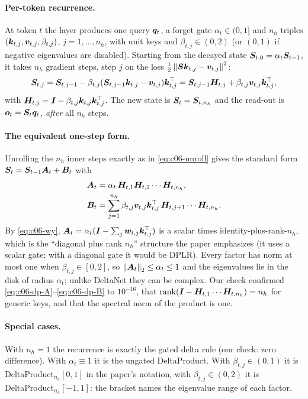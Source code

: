 \paragraph{Per-token recurrence.}
At token $t$ the layer produces one query $\bm{q}_t$, a forget gate $\alpha_t\in(0,1]$ and
$n_h$ triples $(\bm{k}_{t,j},\bm{v}_{t,j},\beta_{t,j})$, $j=1,\dots,n_h$, with unit keys and
$\beta_{t,j}\in(0,2)$ (or $(0,1)$ if negative eigenvalues are disabled). Starting from the
decayed state $\bm{S}_{t,0}=\alpha_t\bm{S}_{t-1}$, it takes $n_h$ gradient steps, step $j$ on the
loss $\tfrac12\left\lVert \bm{S}\bm{k}_{t,j}-\bm{v}_{t,j}\right\rVert^2$:
\begin{equation}\label{eq:c06-dp-step}
  \bm{S}_{t,j}=\bm{S}_{t,j-1}-\beta_{t,j}(\bm{S}_{t,j-1}\bm{k}_{t,j}-\bm{v}_{t,j})\bm{k}_{t,j}^{\top}
          =\bm{S}_{t,j-1}\bm{H}_{t,j}+\beta_{t,j}\bm{v}_{t,j}\bm{k}_{t,j}^{\top},
\end{equation}
with $\bm{H}_{t,j}=\bm{I}-\beta_{t,j}\bm{k}_{t,j}\bm{k}_{t,j}^{\top}$. The new state is
$\bm{S}_t=\bm{S}_{t,n_h}$ and the read-out is $\bm{o}_t=\bm{S}_t\bm{q}_t$, \emph{after} all $n_h$ steps.

\paragraph{The equivalent one-step form.}
Unrolling the $n_h$ inner steps exactly as in \eqref{eq:c06-unroll} gives the standard form
$\bm{S}_t=\bm{S}_{t-1}\bm{A}_t+\bm{B}_t$ with
\begin{align}
  \bm{A}_t&=\alpha_t\,\bm{H}_{t,1}\bm{H}_{t,2}\cdots\bm{H}_{t,n_h}, \label{eq:c06-dp-A}\\
  \bm{B}_t&=\sum_{j=1}^{n_h}\beta_{t,j}\bm{v}_{t,j}\bm{k}_{t,j}^{\top}\,\bm{H}_{t,j+1}\cdots\bm{H}_{t,n_h}. \label{eq:c06-dp-B}
\end{align}
By \eqref{eq:c06-wy}, $\bm{A}_t=\alpha_t(\bm{I}-\sum_j\bm{w}_{t,j}\bm{k}_{t,j}^{\top})$ is a scalar times
identity-plus-rank-$n_h$, which is the ``diagonal plus rank $n_h$'' structure the paper
emphasizes (it uses a scalar gate; with a diagonal gate it would be DPLR). Every factor has
norm at most one when $\beta_{t,j}\in[0,2]$, so $\left\lVert \bm{A}_t\right\rVert_2\le\alpha_t\le1$ and the
eigenvalues lie in the disk of radius $\alpha_t$; unlike DeltaNet they can be complex. Our
check confirmed \eqref{eq:c06-dp-A}--\eqref{eq:c06-dp-B} to $10^{-16}$, that
$\operatorname{rank}(\bm{I}-\bm{H}_{t,1}\cdots\bm{H}_{t,n_h})=n_h$ for generic keys, and that the spectral norm of
the product is one.

\paragraph{Special cases.}
With $n_h=1$ the recurrence is exactly the gated delta rule (our check: zero difference).
With $\alpha_t\equiv1$ it is the ungated DeltaProduct. With $\beta_{t,j}\in(0,1)$ it is
DeltaProduct$_{n_h}[0,1]$ in the paper's notation, with $\beta_{t,j}\in(0,2)$ it is
DeltaProduct$_{n_h}[-1,1]$: the bracket names the eigenvalue range of each factor.

